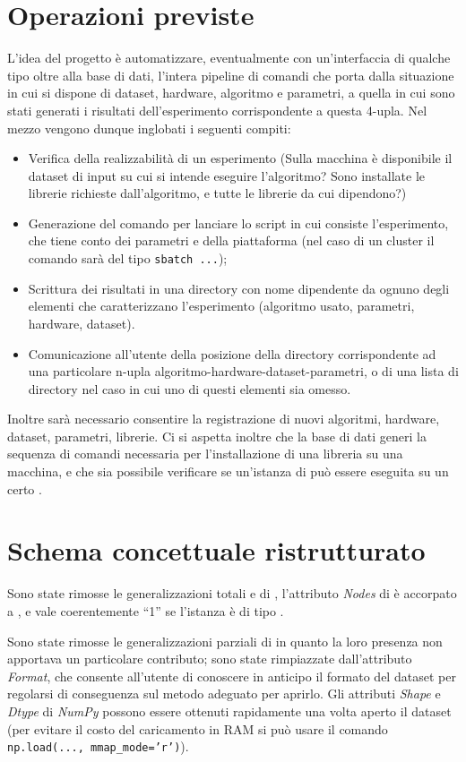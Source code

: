 \documentclass{article}
\begin{document}
\section{Operazioni previste}
L'idea del progetto è automatizzare, eventualmente con un'interfaccia di qualche tipo oltre alla base di dati, l'intera pipeline di comandi che porta dalla situazione in cui si dispone di dataset, hardware, algoritmo e parametri, a quella in cui sono stati generati i risultati dell'esperimento corrispondente a questa 4-upla. Nel mezzo vengono dunque inglobati i seguenti compiti:
\begin{itemize}
    \item Verifica della realizzabilità di un esperimento (Sulla macchina è disponibile il dataset di input su cui si intende eseguire l'algoritmo? Sono installate le librerie richieste dall'algoritmo, e tutte le librerie da cui dipendono?)
    \item Generazione del comando per lanciare lo script in cui consiste l'esperimento, che tiene conto dei parametri e della piattaforma (nel caso di un cluster il comando sarà del tipo \texttt{sbatch ...});
    \item Scrittura dei risultati in una directory con nome dipendente da ognuno degli elementi che caratterizzano l'esperimento (algoritmo usato, parametri, hardware, dataset).
    \item Comunicazione all'utente della posizione della directory corrispondente ad una particolare n-upla algoritmo-hardware-dataset-parametri, o di una lista di directory nel caso in cui uno di questi elementi sia omesso.
\end{itemize}
Inoltre sarà necessario consentire la registrazione di nuovi algoritmi, hardware, dataset, parametri, librerie. Ci si aspetta inoltre che la base di dati generi la sequenza di comandi necessaria per l'installazione di una libreria su una macchina, e che sia possibile verificare se un'istanza di  può essere eseguita su un certo .

\section{Schema concettuale ristrutturato}
Sono state rimosse le generalizzazioni totali  e  di , l'attributo \emph{Nodes} di  è accorpato a , e vale coerentemente ``1'' se l'istanza è di tipo .

Sono state rimosse le generalizzazioni parziali di  in quanto la loro presenza non apportava un particolare contributo; sono state rimpiazzate dall'attributo \emph{Format}, che consente all'utente di conoscere in anticipo il formato del dataset per regolarsi di conseguenza sul metodo adeguato per aprirlo. Gli attributi \emph{Shape} e \emph{Dtype} di \emph{NumPy} possono essere ottenuti rapidamente una volta aperto il dataset (per evitare il costo del caricamento in RAM si può usare il comando \texttt{np.load(..., mmap\_mode='r')}).
\end{document}
